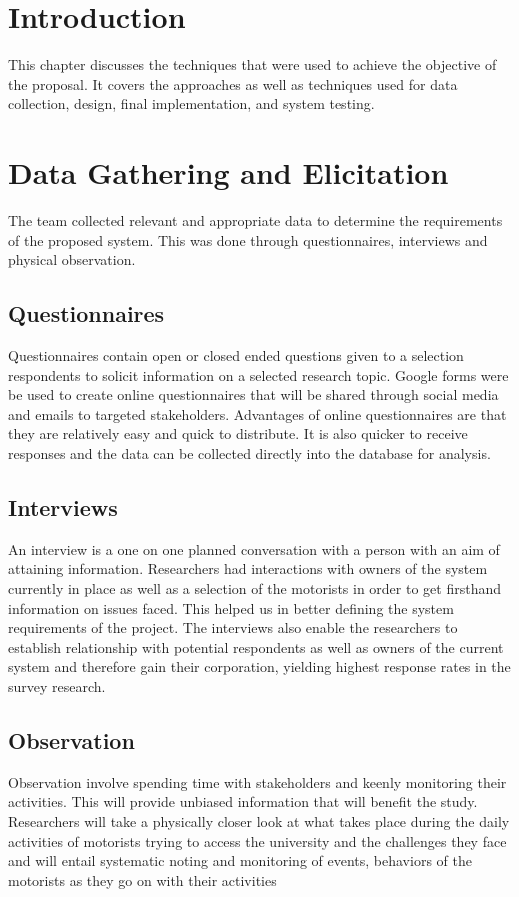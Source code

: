 \section{Introduction}
This chapter discusses the techniques that were used to achieve the objective of the proposal. It covers the approaches as well as techniques  used for  data collection, design, final implementation, and system testing.


\section{Data Gathering and Elicitation}
The team collected relevant and appropriate data to determine the requirements of the proposed system. This was done through questionnaires, interviews and physical observation\cite{kothari_research_2004}.

\subsection{Questionnaires}
Questionnaires contain open or closed ended questions given to a selection respondents to solicit information on a selected research topic\cite{bartram_using_2019}. Google forms were be used to create online questionnaires that will be shared through social media and emails to targeted stakeholders. Advantages of online questionnaires are that they are relatively easy and quick to distribute. It is also quicker to receive responses and the data can be collected directly into the database for analysis.

\subsection{Interviews}
An interview is a one on one planned conversation with a person with an aim of attaining information. Researchers had interactions with owners of the system currently in place as well as a selection of the motorists in order to get firsthand information on issues faced. This helped us  in better defining the system requirements of the project. The interviews also enable the researchers to establish relationship with potential respondents as well as owners of the current system and therefore gain their corporation,  yielding highest response rates in the survey research.

\subsection{Observation}
Observation involve spending time with stakeholders and keenly monitoring their activities. This will provide unbiased information that will benefit the study. Researchers will take a physically closer look at what takes place during the daily activities of motorists trying to access the university and the challenges they face and will entail systematic noting and monitoring of events, behaviors of the motorists as they go on with their activities


